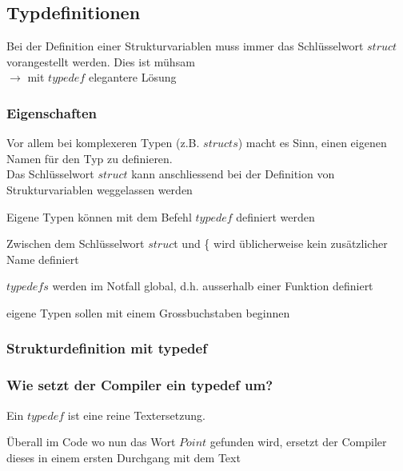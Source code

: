 	\subsection{Typdefinitionen }
		Bei der Definition einer Strukturvariablen muss immer das Schlüsselwort $struct$ vorangestellt werden. Dies ist mühsam\\ $\rightarrow$ mit $typedef$ elegantere Lösung
		\subsubsection{Eigenschaften}
			\begin{compactitem}
				\item Vor allem bei komplexeren Typen (z.B. $structs$) macht es Sinn, einen eigenen Namen für den Typ zu definieren.\\ Das Schlüsselwort $struct$ kann anschliessend bei der Definition von Strukturvariablen weggelassen werden
				\item Eigene Typen können mit dem Befehl $typedef$ definiert werden
				\item Zwischen dem Schlüsselwort $struc$t und \{ wird üblicherweise kein zusätzlicher Name definiert
				\item $typedefs$ werden im Notfall global, d.h. ausserhalb einer Funktion definiert
				\item eigene Typen sollen mit einem Grossbuchstaben beginnen 
			\end{compactitem} 
			
\newpage%

	\begin{minipage}[t]{14 cm}
		\subsubsection{Strukturdefinition mit typedef}
			
	\end{minipage}
	\begin{minipage}[t]{4.5 cm}
		\subsubsection{Wie setzt der Compiler ein typedef um?}
			Ein $typedef$ ist eine reine Textersetzung. 
			
			Überall im Code wo nun das Wort $Point$ gefunden wird, ersetzt der Compiler dieses in einem ersten Durchgang mit dem Text
			 
	\end{minipage}